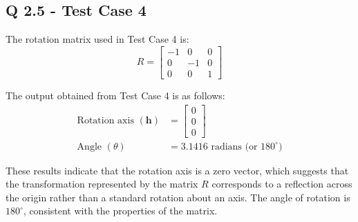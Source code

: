 \subsection{Q 2.5 - Test Case 4}
The rotation matrix used in Test Case 4 is:
\[
R = 
\begin{bmatrix}
-1 & 0 & 0 \\
0 & -1 & 0 \\
0 & 0 & 1
\end{bmatrix}
\]

The output obtained from Test Case 4 is as follows:
\begin{align*}
\text{Rotation axis } (\mathbf{h}) &= 
\begin{bmatrix}
0 \\
0 \\
0
\end{bmatrix} \\
\text{Angle } (\theta) &= 3.1416 \text{ radians (or } 180^\circ\text{)}
\end{align*}

These results indicate that the rotation axis is a zero vector, which suggests that the transformation represented by the matrix \( R \) corresponds to a reflection across the origin rather than a standard rotation about an axis. The angle of rotation is \( 180^\circ \), consistent with the properties of the matrix.
